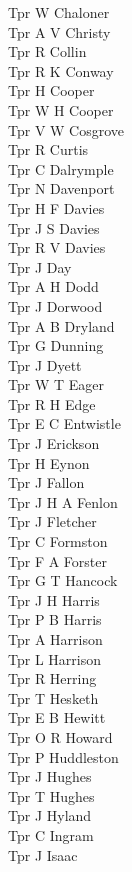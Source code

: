 \begin{multicols}{2}
  Tpr W Chaloner \\
  Tpr A V Christy \\
  Tpr R Collin \\
  Tpr R K Conway \\
  Tpr H Cooper \\
  Tpr W H Cooper \\
  Tpr V W Cosgrove \\
  Tpr R Curtis \\
  Tpr C Dalrymple \\
  Tpr N Davenport \\
  Tpr H F Davies \\
  Tpr J S Davies \\
  Tpr R V Davies \\
  Tpr J Day \\
  Tpr A H Dodd \\
  Tpr J Dorwood \\
  Tpr A B Dryland \\
  Tpr G Dunning \\
  Tpr J Dyett \\
  Tpr W T Eager \\
  Tpr R H Edge \\
  Tpr E C Entwistle \\
  Tpr J Erickson \\
  Tpr H Eynon \\
  Tpr J Fallon \\
  Tpr J H A Fenlon \\
  Tpr J Fletcher \\
  Tpr C Formston \\
  Tpr F A Forster \\
  Tpr G T Hancock \\
  Tpr J H Harris \\
  Tpr P B Harris \\
  Tpr A Harrison \\
  Tpr L Harrison \\
  Tpr R Herring \\
  Tpr T Hesketh \\
  Tpr E B Hewitt \\
  Tpr O R Howard \\
  Tpr P Huddleston \\
  Tpr J Hughes \\
  Tpr T Hughes \\
  Tpr J Hyland \\
  Tpr C Ingram \\
  Tpr J Isaac \\

\end{multicols}

